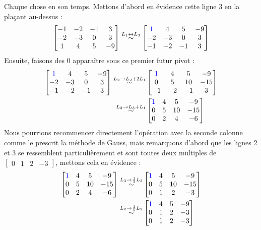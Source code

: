 \documentclass{article}
\begin{document}
\noindent Chaque chose en son temps. Mettons d'abord en évidence cette ligne 3 en la plaçant au-dessus :
$$\begin{bmatrix}
-1 & -2 & -1 & 3 \\
-2 & -3 &  0 & 3 \\
1  &  4 &  5 & -9
\end{bmatrix}
\overset{L_1 \leftrightarrow L_3}{\sim} 
\begin{bmatrix}
\color{blue}1  &  4 &  5 & -9\\
-2 & -3 &  0 & 3 \\
-1 & -2 & -1 & 3 
\end{bmatrix}
$$
Ensuite, faisons des $0$ apparaître sous ce premier futur pivot :
\begin{align*}
\begin{bmatrix}
\color{blue}1  &  4 &  5 & -9\\
-2 & -3 &  0 & 3 \\
-1 & -2 & -1 & 3 
\end{bmatrix}
\overset{L_2 \to L_2 + 2L_1}{\sim}
&\begin{bmatrix}
\color{blue}1  &  4 &  5 & -9\\
0 & 5 &  10 & -15 \\
-1 & -2 & -1 & 3 
\end{bmatrix}\\
\overset{L_3 \to L_3 + L_1}{\sim}
&\begin{bmatrix}
\color{blue}1  &  4 &  5 & -9\\
0 & 5 &  10 & -15 \\
0 & 2 & 4 & -6 
\end{bmatrix}
\end{align*}
Nous pourrions recommencer directement l'opération avec la seconde colonne comme le prescrit la méthode de Gauss, mais remarquons d'abord que les lignes 2 et 3 se ressemblent particulièrement et sont toutes deux multiples de $\begin{bmatrix}
0 & 1 & 2 & -3
\end{bmatrix}$, mettons cela en évidence :
\begin{align*}
\begin{bmatrix}
\color{blue}1  &  4 &  5 & -9\\
0 & 5 &  10 & -15 \\
0 & 2 & 4 & -6 
\end{bmatrix}
\overset{L_3 \to \frac{1}{2}L_3}{\sim}
&\begin{bmatrix}
\color{blue}1  &  4 &  5 & -9\\
0 & 5 &  10 & -15 \\
0 & 1 & 2 & -3 
\end{bmatrix}\\
\overset{L_2 \to \frac{1}{5}L_2}{\sim}
&\begin{bmatrix}
\color{blue}1  &  4 &  5 & -9\\
0 & 1 & 2 & -3 \\
0 & 1 & 2 & -3 
\end{bmatrix}
\end{align*}
\end{document}
